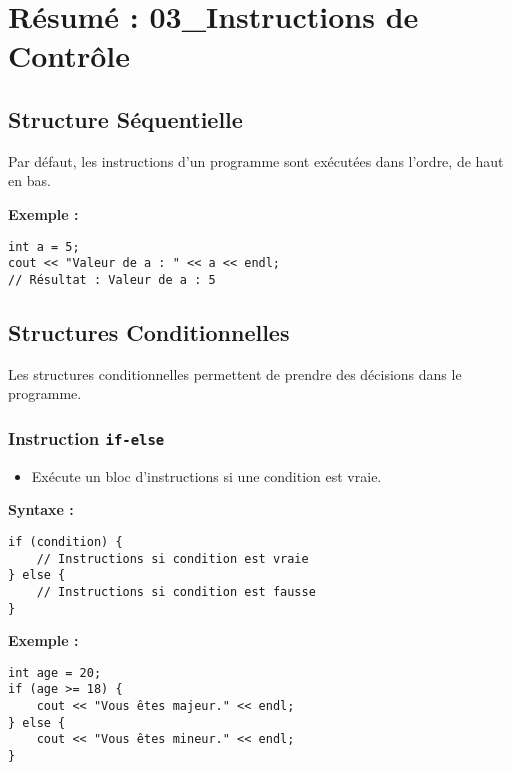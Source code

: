 \section{ Résumé : 03\_Instructions de Contrôle}

\subsection{ Structure Séquentielle}
Par défaut, les instructions d'un programme sont exécutées dans l'ordre, de haut en bas.

\textbf{Exemple :}
\begin{tcolorbox}[colframe=blue!50!black, colback=blue!5!white, title=Exemple de Structure Séquentielle]
\begin{verbatim}
int a = 5;
cout << "Valeur de a : " << a << endl;
// Résultat : Valeur de a : 5
\end{verbatim}
\end{tcolorbox}

\subsection{ Structures Conditionnelles}
Les structures conditionnelles permettent de prendre des décisions dans le programme.

\subsubsection{ Instruction \texttt{if-else}}
\begin{itemize}
    \item Exécute un bloc d'instructions si une condition est vraie.
\end{itemize}

\textbf{Syntaxe :}
\begin{tcolorbox}[colframe=blue!50!black, colback=blue!5!white, title=Syntaxe de l'Instruction if-else]
\begin{verbatim}
if (condition) {
    // Instructions si condition est vraie
} else {
    // Instructions si condition est fausse
}
\end{verbatim}
\end{tcolorbox}

\textbf{Exemple :}
\begin{tcolorbox}[colframe=blue!50!black, colback=blue!5!white, title=Exemple de l'Instruction if-else]
\begin{verbatim}
int age = 20;
if (age >= 18) {
    cout << "Vous êtes majeur." << endl;
} else {
    cout << "Vous êtes mineur." << endl;
}
\end{verbatim}
\end{tcolorbox}

